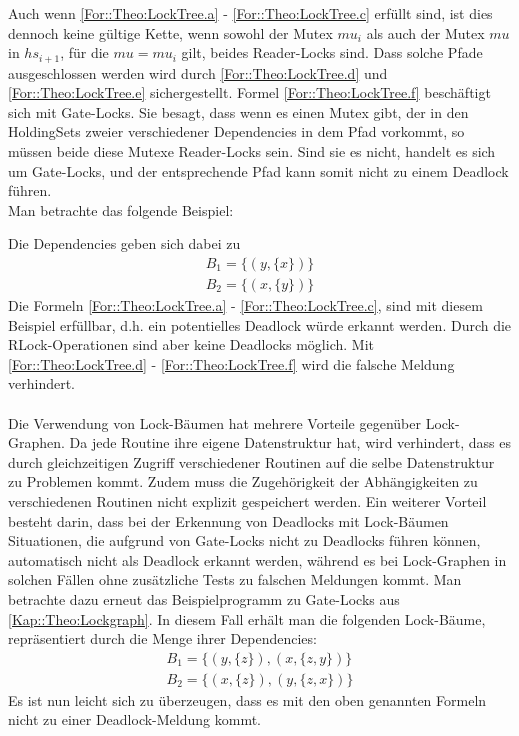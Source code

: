 Auch wenn \eqref{For::Theo:LockTree.a} - \eqref{For::Theo:LockTree.c} erfüllt sind, 
ist dies dennoch keine gültige Kette, wenn sowohl der
Mutex $mu_i$ als auch der Mutex $mu$ in $hs_{i+1}$, für die $mu = mu_i$ gilt, 
beides Reader-Locks sind. Dass solche Pfade ausgeschlossen werden wird durch 
\eqref{For::Theo:LockTree.d} und \eqref{For::Theo:LockTree.e} sichergestellt. Formel 
\eqref{For::Theo:LockTree.f} beschäftigt sich mit Gate-Locks. 
Sie besagt, dass wenn es einen Mutex gibt, 
der in den HoldingSets zweier verschiedener Dependencies in dem Pfad vorkommt, 
so müssen beide diese Mutexe Reader-Locks sein. Sind sie es nicht, handelt es 
sich um Gate-Locks, und der entsprechende Pfad kann somit nicht zu einem 
Deadlock führen.\\ Man betrachte das folgende Beispiel:
\begin{figure}[H]
    
\end{figure}
Die Dependencies geben sich dabei zu 
\begin{align*}
    B_1 = \{(y, \{x\})\}\\
    B_2 = \{(x, \{y\})\}
\end{align*}
Die Formeln \eqref{For::Theo:LockTree.a} - \eqref{For::Theo:LockTree.c}, 
sind mit diesem Beispiel erfüllbar, d.h. ein potentielles Deadlock würde 
erkannt werden. Durch die RLock-Operationen sind aber keine Deadlocks 
möglich. Mit \eqref{For::Theo:LockTree.d} - \eqref{For::Theo:LockTree.f} wird die 
falsche Meldung verhindert.\\\\
Die Verwendung von Lock-Bäumen hat mehrere Vorteile gegenüber Lock-Graphen. 
Da jede Routine ihre 
eigene Datenstruktur hat, wird verhindert, dass es durch 
gleichzeitigen Zugriff verschiedener Routinen auf die selbe Datenstruktur zu 
Problemen kommt. Zudem muss die Zugehörigkeit der Abhängigkeiten zu 
verschiedenen Routinen nicht explizit gespeichert werden. Ein weiterer Vorteil 
besteht darin, dass bei der Erkennung von Deadlocks mit Lock-Bäumen Situationen,
die aufgrund von Gate-Locks nicht zu Deadlocks führen können, automatisch nicht
als Deadlock erkannt werden, während es bei Lock-Graphen in solchen Fällen ohne 
zusätzliche Tests zu falschen Meldungen kommt. Man betrachte dazu erneut das 
Beispielprogramm zu Gate-Locks aus \ref{Kap::Theo:Lockgraph}.
In diesem Fall erhält man die folgenden Lock-Bäume, repräsentiert durch die Menge
ihrer Dependencies:
\begin{align}
    B_1 = \{(y, \{z\}), (x, \{z, y\})\}\\
    B_2 = \{(x, \{z\}), (y, \{z, x\})\}
\end{align}
Es ist nun leicht sich zu überzeugen, dass es mit den oben genannten Formeln nicht 
zu einer Deadlock-Meldung kommt.

